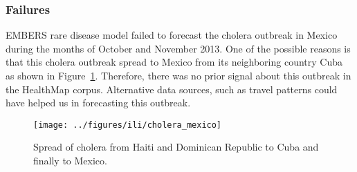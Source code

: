 \subsubsection{Failures}

EMBERS rare disease model failed to forecast the cholera outbreak in Mexico during the months of October and November 2013. One of the possible reasons is that this cholera outbreak spread to Mexico from its neighboring country Cuba as shown in Figure~\ref{fig:cholera_mexico}. Therefore, there was no prior signal about this outbreak in the HealthMap corpus. Alternative data sources, such as travel patterns could have helped us in forecasting this outbreak.

\begin{figure}
  \texttt{[image: ../figures/ili/cholera\_mexico]}
  \caption{\label{fig:cholera_mexico} Spread of cholera from Haiti and Dominican Republic to Cuba and finally to Mexico.}
\end{figure}
